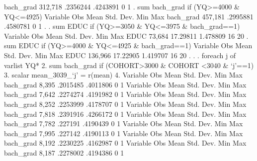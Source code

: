    bach_grad {\VBAR}    312,718    .2356244    .4243891          0          1
{\smallskip}
. sum bach_grad if (YQ>=4000 \& YQ<=4925)
{\smallskip}
    Variable {\VBAR}        Obs        Mean    Std. Dev.       Min        Max
   bach_grad {\VBAR}    457,181    .2995881    .4580781          0          1
{\smallskip}
. 
. sum EDUC if (YQ>=3050 \& YQ<=3975 \& bach_grad==1)
{\smallskip}
    Variable {\VBAR}        Obs        Mean    Std. Dev.       Min        Max
        EDUC {\VBAR}     73,684    17.29811    1.478809         16         20
{\smallskip}
. sum EDUC if (YQ>=4000 \& YQ<=4925 \& bach_grad==1)
{\smallskip}
    Variable {\VBAR}        Obs        Mean    Std. Dev.       Min        Max
        EDUC {\VBAR}    136,966    17.22905    1.419707         16         20
{\smallskip}
. 
. 
. foreach j of varlist YQ* {\lbr}
  2.                 sum bach_grad if (COHORT>3000 \& COHORT <3040 \& `j'==1)
  3.                 scalar mean_3039_`j' = r(mean)
  4. {\rbr}       
{\smallskip}
    Variable {\VBAR}        Obs        Mean    Std. Dev.       Min        Max
   bach_grad {\VBAR}      8,395    .2015485    .4011806          0          1
{\smallskip}
    Variable {\VBAR}        Obs        Mean    Std. Dev.       Min        Max
   bach_grad {\VBAR}      7,642    .2274274    .4191982          0          1
{\smallskip}
    Variable {\VBAR}        Obs        Mean    Std. Dev.       Min        Max
   bach_grad {\VBAR}      8,252    .2253999    .4178707          0          1
{\smallskip}
    Variable {\VBAR}        Obs        Mean    Std. Dev.       Min        Max
   bach_grad {\VBAR}      7,818    .2391916    .4266172          0          1
{\smallskip}
    Variable {\VBAR}        Obs        Mean    Std. Dev.       Min        Max
   bach_grad {\VBAR}      7,782     .227191    .4190439          0          1
{\smallskip}
    Variable {\VBAR}        Obs        Mean    Std. Dev.       Min        Max
   bach_grad {\VBAR}      7,995     .227142    .4190113          0          1
{\smallskip}
    Variable {\VBAR}        Obs        Mean    Std. Dev.       Min        Max
   bach_grad {\VBAR}      8,192    .2230225    .4162987          0          1
{\smallskip}
    Variable {\VBAR}        Obs        Mean    Std. Dev.       Min        Max
   bach_grad {\VBAR}      8,187    .2278002    .4194386          0          1
